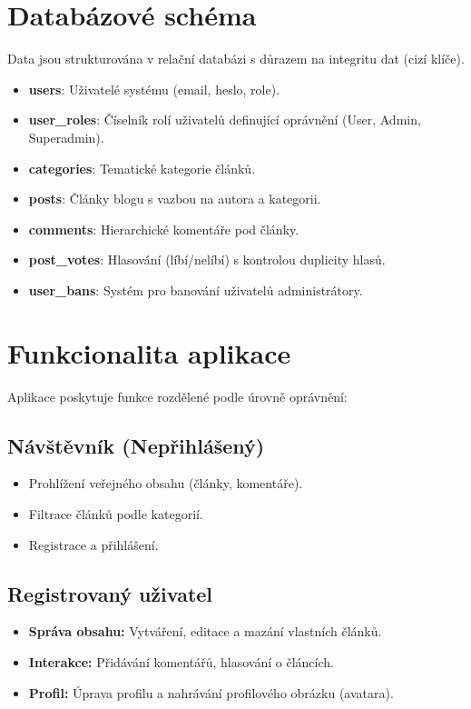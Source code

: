 \documentclass[12pt,a4paper]{article}
\begin{document}
\section{Databázové schéma}
Data jsou strukturována v relační databázi s důrazem na integritu dat (cizí klíče).

\begin{itemize}
    \item \textbf{users}: Uživatelé systému (email, heslo, role).
    \item \textbf{user\_roles}: Číselník rolí uživatelů definující oprávnění (User, Admin, Superadmin).
    \item \textbf{categories}: Tematické kategorie článků.
    \item \textbf{posts}: Články blogu s vazbou na autora a kategorii.
    \item \textbf{comments}: Hierarchické komentáře pod články.
    \item \textbf{post\_votes}: Hlasování (líbí/nelíbí) s kontrolou duplicity hlasů.
    \item \textbf{user\_bans}: Systém pro banování uživatelů administrátory.
\end{itemize}

\newpage


\section{Funkcionalita aplikace}

Aplikace poskytuje funkce rozdělené podle úrovně oprávnění:

\subsection*{Návštěvník (Nepřihlášený)}
\begin{itemize}
    \item Prohlížení veřejného obsahu (články, komentáře).
    \item Filtrace článků podle kategorií.
    \item Registrace a přihlášení.
\end{itemize}

\subsection*{Registrovaný uživatel}
\begin{itemize}
    \item \textbf{Správa obsahu:} Vytváření, editace a mazání vlastních článků.
    \item \textbf{Interakce:} Přidávání komentářů, hlasování o článcích.
    \item \textbf{Profil:} Úprava profilu a nahrávání profilového obrázku (avatara).
\end{itemize}
\end{document}
